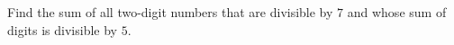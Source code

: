 Find the sum of all two-digit numbers that are divisible by $7$ and whose sum of digits is divisible by $5$.
